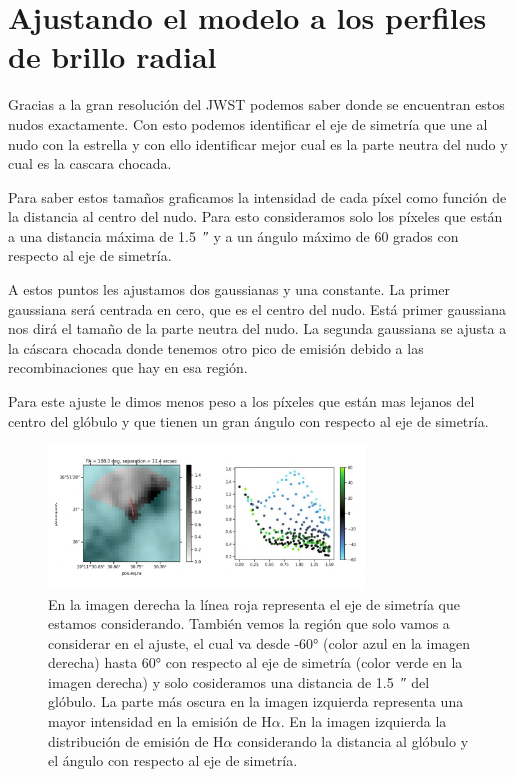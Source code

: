\documentclass{book}
\begin{document}
\section{Ajustando el modelo a los perfiles de brillo radial}

Gracias a la gran resolución del JWST podemos saber donde se encuentran estos nudos exactamente. Con esto podemos identificar el eje de simetría que une al nudo con la estrella y con ello identificar mejor cual es la parte neutra del nudo y cual es la cascara chocada.

Para saber estos tamaños graficamos la intensidad de cada píxel como función de la distancia al centro del nudo. Para esto consideramos solo los píxeles que están a una distancia máxima de \SI{1.5}{\arcsecond} y a un ángulo máximo de 60 grados con respecto al eje de simetría.

A estos puntos les ajustamos dos gaussianas y una constante. La primer gaussiana será centrada en cero, que es el centro del nudo. Está primer gaussiana nos dirá el tamaño de la parte neutra del nudo. La segunda gaussiana se ajusta a la cáscara chocada donde tenemos otro pico de emisión debido a las recombinaciones que hay en esa región.

Para este ajuste le dimos menos peso a los píxeles que están mas lejanos del centro del glóbulo y que tienen un gran ángulo con respecto al eje de simetría.

\begin{figure}[h!]
    \centering
    \includegraphics[width=0.75\textwidth]{images Chapter 3/C3_mask.jpg}
    \caption{En la imagen derecha la línea roja representa el eje de simetría que estamos considerando. También vemos la región que solo vamos a considerar en el ajuste, el cual va desde \ang{-60}  (color azul en la imagen derecha) hasta \ang{60} con respecto al eje de simetría (color verde en la imagen derecha) y solo cosideramos una distancia de  \SI{1.5}{\arcsecond} del glóbulo. La parte más oscura en la imagen izquierda representa una mayor intensidad en la emisión de H$\alpha$. En la imagen izquierda la distribución de emisión de H$\alpha$ considerando la distancia al glóbulo y el ángulo con respecto al eje de simetría.}
    \label{ejemplo mascara}
\end{figure}
\end{document}
